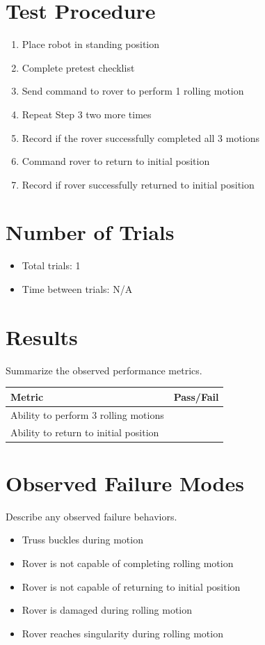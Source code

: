 \documentclass[11pt]{article}
\begin{document}
\section*{Test Procedure}
\begin{enumerate}[noitemsep]
    \item Place robot in standing position
    \item Complete pretest checklist
    \item Send command to rover to perform 1 rolling motion
    \item Repeat Step 3 two more times 
    \item Record if the rover successfully completed all 3 motions
    \item Command rover to return to initial position
    \item Record if rover successfully returned to initial position

\end{enumerate}

\section*{Number of Trials}
\begin{itemize}[noitemsep]
    \item Total trials: 1
    \item Time between trials: N/A
\end{itemize}

\section*{Results}
Summarize the observed performance metrics.

\begin{center}
\begin{tabular}{lc}
\toprule
Metric & Pass/Fail\\
\midrule
Ability to perform 3 rolling motions&  \\
 Ability to return to initial position &\\
\end{tabular}
\end{center}

\section*{Observed Failure Modes}
Describe any observed failure behaviors.

\begin{itemize}[noitemsep]
    \item Truss buckles during motion
    \item Rover is not capable of completing rolling motion
    \item Rover is not capable of returning to initial position
    \item Rover is damaged during rolling motion
    \item Rover reaches singularity during rolling motion
\end{itemize}
\end{document}
